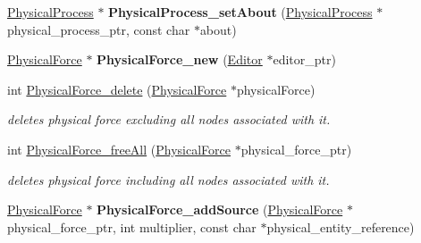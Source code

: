 \begin{DoxyCompactItemize}
\item 
\mbox{\label{namespaceomexmeta_afde7fdd0535279191576bcab4a9d665b}} 
\hyperlink{classomexmeta_1_1PhysicalProcess}{Physical\+Process} $\ast$ {\bfseries Physical\+Process\+\_\+set\+About} (\hyperlink{classomexmeta_1_1PhysicalProcess}{Physical\+Process} $\ast$physical\+\_\+process\+\_\+ptr, const char $\ast$about)
\item 
\mbox{\label{namespaceomexmeta_a20e720c23e2368bf19c316971ebeafd7}} 
\hyperlink{classomexmeta_1_1PhysicalForce}{Physical\+Force} $\ast$ {\bfseries Physical\+Force\+\_\+new} (\hyperlink{classomexmeta_1_1Editor}{Editor} $\ast$editor\+\_\+ptr)
\item 
\mbox{\label{namespaceomexmeta_aad5757f8832cf5fcaf546cec1f97af82}} 
int \hyperlink{namespaceomexmeta_aad5757f8832cf5fcaf546cec1f97af82}{Physical\+Force\+\_\+delete} (\hyperlink{classomexmeta_1_1PhysicalForce}{Physical\+Force} $\ast$physical\+Force)
\begin{DoxyCompactList}\small\item\em deletes physical force excluding all nodes associated with it. \end{DoxyCompactList}\item 
\mbox{\label{namespaceomexmeta_ac9903c88bb127f778476bdffe075ed8a}} 
int \hyperlink{namespaceomexmeta_ac9903c88bb127f778476bdffe075ed8a}{Physical\+Force\+\_\+free\+All} (\hyperlink{classomexmeta_1_1PhysicalForce}{Physical\+Force} $\ast$physical\+\_\+force\+\_\+ptr)
\begin{DoxyCompactList}\small\item\em deletes physical force including all nodes associated with it. \end{DoxyCompactList}\item 
\mbox{\label{namespaceomexmeta_ae66097c6bfe2f6370bcb614a3d384a41}} 
\hyperlink{classomexmeta_1_1PhysicalForce}{Physical\+Force} $\ast$ {\bfseries Physical\+Force\+\_\+add\+Source} (\hyperlink{classomexmeta_1_1PhysicalForce}{Physical\+Force} $\ast$physical\+\_\+force\+\_\+ptr, int multiplier, const char $\ast$physical\+\_\+entity\+\_\+reference)
\item 
\mbox{\label{namespaceomexmeta_a75abc8bc74d8bacefd65935f49210343}} 

\end{DoxyCompactItemize}
